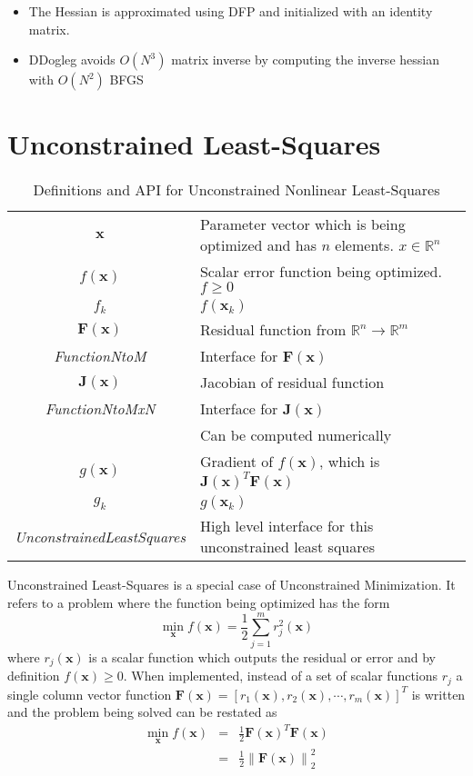 \documentclass[peerreview,onecolumn]{IEEEtran}
\newcommand{\R}{\mathbb{R}}
\newcommand{\norm}[1]{\left\lVert#1\right\rVert}
\begin{document}
\begin{itemize}
	\item The Hessian is approximated using DFP and initialized with an identity matrix. 
	\item DDogleg avoids $O(N^3)$ matrix inverse by computing the inverse hessian with $O(N^2)$ BFGS
\end{itemize}

\section{Unconstrained Least-Squares}
\begin{table*}[h]
\centering
\begin{tabular}{cl}
$\bm{x}$ & Parameter vector which is being optimized and has $n$ elements. $x \in \R^n$ \\
$f(\bm{x})$ & Scalar error function being optimized. $f \ge 0$ \\
$f_k$ & $f(\bm{x}_k)$ \\
$\bm{F}(\bm{x})$ &  Residual function from $\mathbb{R}^n \rightarrow \R^m$ \\
\textit{FunctionNtoM} & Interface for $\bm{F}(\bm{x})$ \\
$\bm{J}(\bm{x})$ & Jacobian of residual function \\
\textit{FunctionNtoMxN} & Interface for $\bm{J}(\bm{x})$ \\
 & Can be computed numerically \\
$g(\bm{x})$ & Gradient of $f(\bm{x})$, which is $\bm{J}(\bm{x})^T  \bm{F}(\bm{x})$ \\
$g_k$ & $g(\bm{x}_k)$ \\
\textit{UnconstrainedLeastSquares} & High level interface for this unconstrained least squares
\end{tabular}
\caption{\label{definitions:UNLS}Definitions and API for Unconstrained Nonlinear Least-Squares}
\end{table*}

Unconstrained Least-Squares is a special case of Unconstrained Minimization. It refers to a problem where the function being optimized has the form
\begin{equation}
\min\limits_{\bm{x}} f(\bm{x})=\frac{1}{2}\sum^m_{j=1} r^2_j(\bm{x})
\end{equation}
where $r_j(\bm{x})$ is a scalar function which outputs the residual or error and by definition $f(\bm{x}) \ge 0$. When implemented, instead of a set of scalar functions $r_j$ a single column vector function $\bm{F}(\bm{x}) = [ r_1(\bm{x}) , r_2(\bm{x}) , \cdots , r_m(\bm{x}) ]^T$ is written and the problem being solved can be restated as
\begin{eqnarray}
\min\limits_{\bm{x}} f(\bm{x})&=&\frac{1}{2} \bm{F}(\bm{x})^T \bm{F}(\bm{x})\\
&=& \frac{1}{2} \norm{\bm{F}(\bm{x})}^2_2
\end{eqnarray}
\end{document}
